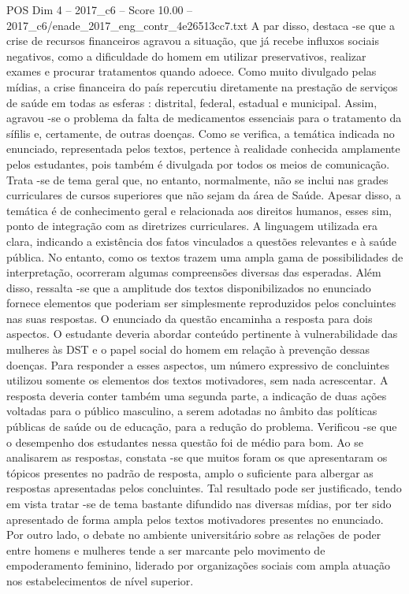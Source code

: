 \begin{textsample}{POS Dim 4 – 2017\_c6 – Score 10.00 – 2017\_c6/enade\_2017\_eng\_contr\_4e26513cc7.txt}
A par disso, destaca -se que a crise de recursos financeiros agravou a situação, que já recebe influxos sociais negativos, como a dificuldade do homem em utilizar preservativos, realizar exames e procurar tratamentos quando adoece.
Como muito divulgado pelas mídias, a crise financeira do país repercutiu diretamente na prestação de serviços de saúde em todas as esferas : distrital, federal, estadual e municipal.
Assim, agravou -se o problema da falta de medicamentos essenciais para o tratamento da sífilis e, certamente, de outras doenças.
Como se verifica, a temática indicada no enunciado, representada pelos textos, pertence à realidade conhecida amplamente pelos estudantes, pois também é divulgada por todos os meios de comunicação.
Trata -se de tema geral que, no entanto, normalmente, não se inclui nas grades curriculares de cursos superiores que não sejam da área de Saúde.
Apesar disso, a temática é de conhecimento geral e relacionada aos direitos humanos, esses sim, ponto de integração com as diretrizes curriculares.
A linguagem utilizada era clara, indicando a existência dos fatos vinculados a questões relevantes e à saúde pública.
No entanto, como os textos trazem uma ampla gama de possibilidades de interpretação, ocorreram algumas compreensões diversas das esperadas.
Além disso, ressalta -se que a amplitude dos textos disponibilizados no enunciado fornece elementos que poderiam ser simplesmente reproduzidos pelos concluintes nas suas respostas.
O enunciado da questão encaminha a resposta para dois aspectos.
O estudante deveria abordar conteúdo pertinente à vulnerabilidade das mulheres às DST e o papel social do homem em relação à prevenção dessas doenças.
Para responder a esses aspectos, um número expressivo de concluintes utilizou somente os elementos dos textos motivadores, sem nada acrescentar.
A resposta deveria conter também uma segunda parte, a indicação de duas ações voltadas para o público masculino, a serem adotadas no âmbito das políticas públicas de saúde ou de educação, para a redução do problema.
Verificou -se que o desempenho dos estudantes nessa questão foi de médio para bom.
Ao se analisarem as respostas, constata -se que muitos foram os que apresentaram os tópicos presentes no padrão de resposta, amplo o suficiente para albergar as respostas apresentadas pelos concluintes.
Tal resultado pode ser justificado, tendo em vista tratar -se de tema bastante difundido nas diversas mídias, por ter sido apresentado de forma ampla pelos textos motivadores presentes no enunciado.
Por outro lado, o debate no ambiente universitário sobre as relações de poder entre homens e mulheres tende a ser marcante pelo movimento de empoderamento feminino, liderado por organizações sociais com ampla atuação nos estabelecimentos de nível superior.

\end{textsample}
